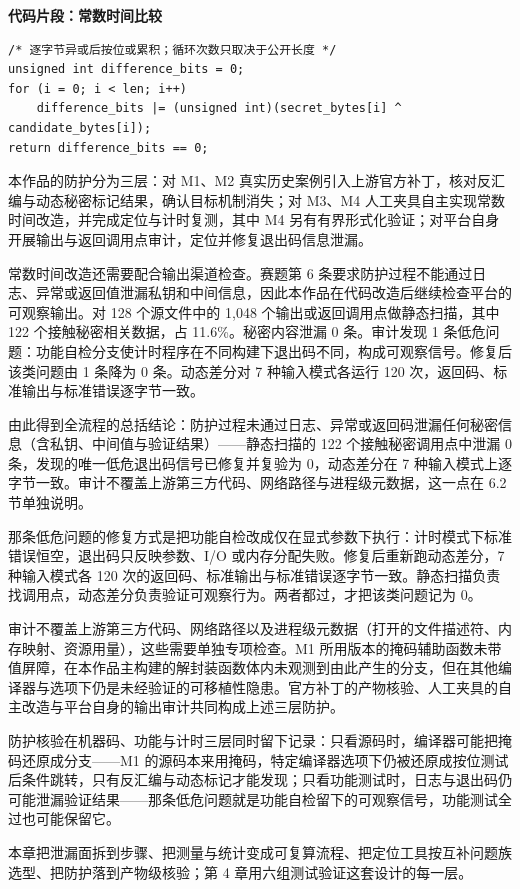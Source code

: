 \noindent\begin{minipage}{\linewidth}
\noindent\textbf{代码片段：常数时间比较}\par\smallskip
\begin{lstlisting}
/* 逐字节异或后按位或累积；循环次数只取决于公开长度 */
unsigned int difference_bits = 0;
for (i = 0; i < len; i++)
    difference_bits |= (unsigned int)(secret_bytes[i] ^ candidate_bytes[i]);
return difference_bits == 0;
\end{lstlisting}
\end{minipage}

本作品的防护分为三层：对 M1、M2 真实历史案例引入上游官方补丁，核对反汇编与动态秘密标记结果，确认目标机制消失；对 M3、M4 人工夹具自主实现常数时间改造，并完成定位与计时复测，其中 M4 另有有界形式化验证；对平台自身开展输出与返回调用点审计，定位并修复退出码信息泄漏。

常数时间改造还需要配合输出渠道检查。赛题第 6 条要求防护过程不能通过日志、异常或返回值泄漏私钥和中间信息，因此本作品在代码改造后继续检查平台的可观察输出。对 128 个源文件中的 1,048 个输出或返回调用点做静态扫描，其中 122 个接触秘密相关数据，占 11.6\%。秘密内容泄漏 0 条。审计发现 1 条低危问题：功能自检分支使计时程序在不同构建下退出码不同，构成可观察信号。修复后该类问题由 1 条降为 0 条。动态差分对 7 种输入模式各运行 120 次，返回码、标准输出与标准错误逐字节一致。 %

由此得到全流程的总括结论：防护过程未通过日志、异常或返回码泄漏任何秘密信息（含私钥、中间值与验证结果）——静态扫描的 122 个接触秘密调用点中泄漏 0 条，发现的唯一低危退出码信号已修复并复验为 0，动态差分在 7 种输入模式上逐字节一致。审计不覆盖上游第三方代码、网络路径与进程级元数据，这一点在 6.2 节单独说明。

那条低危问题的修复方式是把功能自检改成仅在显式参数下执行：计时模式下标准错误恒空，退出码只反映参数、I/O 或内存分配失败。修复后重新跑动态差分，7 种输入模式各 120 次的返回码、标准输出与标准错误逐字节一致。静态扫描负责找调用点，动态差分负责验证可观察行为。两者都过，才把该类问题记为 0。

审计不覆盖上游第三方代码、网络路径以及进程级元数据（打开的文件描述符、内存映射、资源用量），这些需要单独专项检查。M1 所用版本的掩码辅助函数未带值屏障，在本作品主构建的解封装函数体内未观测到由此产生的分支，但在其他编译器与选项下仍是未经验证的可移植性隐患。官方补丁的产物核验、人工夹具的自主改造与平台自身的输出审计共同构成上述三层防护。

防护核验在机器码、功能与计时三层同时留下记录：只看源码时，编译器可能把掩码还原成分支——M1 的源码本来用掩码，特定编译器选项下仍被还原成按位测试后条件跳转，只有反汇编与动态标记才能发现；只看功能测试时，日志与退出码仍可能泄漏验证结果——那条低危问题就是功能自检留下的可观察信号，功能测试全过也可能保留它。

本章把泄漏面拆到步骤、把测量与统计变成可复算流程、把定位工具按互补问题族选型、把防护落到产物级核验；第 4 章用六组测试验证这套设计的每一层。